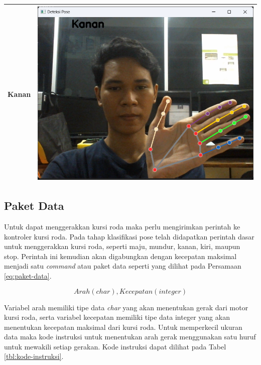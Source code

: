 \begin{table}[H]
\begin{tabular}{|c|c|}
        Kanan               & \includegraphics[scale=0.33]{gambar/bab3/Kanan.png}  \\ \hline
    \end{tabular}
\end{table}

\subsection{Paket Data}
Untuk dapat menggerakkan kursi roda maka perlu mengirimkan perintah ke kontroler kursi roda. Pada tahap klasifikasi pose telah didapatkan perintah dasar untuk menggerakkan kursi roda, seperti maju, mundur, kanan, kiri, maupun stop. Perintah ini kemudian akan digabungkan dengan kecepatan maksimal menjadi satu \emph{command} atau paket data seperti yang dilihat pada Persamaan \ref{eq:paket-data}.

\begin{equation}
  \label{eq:paket-data}
    Arah(char),Kecepatan(integer)
\end{equation}

Variabel arah memiliki tipe data \emph{char} yang akan menentukan gerak dari motor kursi roda, serta variabel kecepatan memiliki tipe data integer yang akan menentukan kecepatan maksimal dari kursi roda. Untuk memperkecil ukuran data maka kode instruksi untuk menentukan arah gerak menggunakan satu huruf untuk mewakili setiap gerakan. Kode instruksi dapat dilihat pada Tabel \ref{tbl:kode-instruksi}. 

